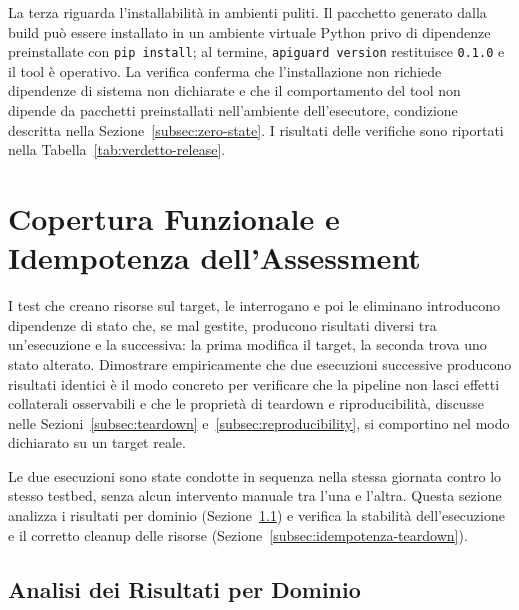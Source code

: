 La terza riguarda l'installabilità in ambienti puliti. Il pacchetto generato dalla build può essere installato in un ambiente virtuale Python privo di dipendenze preinstallate con \texttt{pip~install}; al termine, \texttt{apiguard~version} restituisce \texttt{0.1.0} e il tool è operativo. La verifica conferma che l'installazione non richiede dipendenze di sistema non dichiarate e che il comportamento del tool non dipende da pacchetti preinstallati nell'ambiente dell'esecutore, condizione descritta nella Sezione~\ref{subsec:zero-state}. I risultati delle verifiche sono riportati nella Tabella~\ref{tab:verdetto-release}.










\section{Copertura Funzionale e Idempotenza dell'Assessment}%
\label{sec:coverage-idempotenza}

I test che creano risorse sul target, le interrogano e poi le eliminano introducono dipendenze di stato che, se mal gestite, producono risultati diversi tra un'esecuzione e la successiva: la prima modifica il target, la seconda trova uno stato alterato. Dimostrare empiricamente che due esecuzioni successive producono risultati identici è il modo concreto per verificare che la pipeline non lasci effetti collaterali osservabili e che le proprietà di teardown e riproducibilità, discusse nelle Sezioni~\ref{subsec:teardown} e~\ref{subsec:reproducibility}, si comportino nel modo dichiarato su un target reale.

Le due esecuzioni sono state condotte in sequenza nella stessa giornata contro lo stesso testbed, senza alcun intervento manuale tra l'una e l'altra. Questa sezione analizza i risultati per dominio (Sezione~\ref{subsec:analisi-domini}) e verifica la stabilità dell'esecuzione e il corretto cleanup delle risorse (Sezione~\ref{subsec:idempotenza-teardown}).


\subsection{Analisi dei Risultati per Dominio}\label{subsec:analisi-domini}

